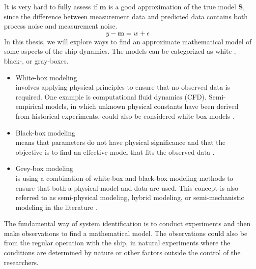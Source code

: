 It is very hard to fully assess if $\mathbf{m}$ is a good approximation of the true model $\mathbf{S}$, since the difference between measurement data and predicted data contains both process noise and measurement noise.
$$
y - \mathbf{m} = w + \epsilon
$$
In this thesis, we will explore ways to find an approximate mathematical model of some aspects of the ship dynamics. The models can be categorized as white-, black-, or gray-boxes. 
\vspace{5pt}
\begin{itemize}
    \setlength\itemsep{5pt}
    \item White-box modeling \\
    involves applying physical principles to ensure that no observed data is required. One example is computational fluid dynamics (CFD). Semi-empirical models, in which unknown physical constants have been derived from historical experiments, could also be considered white-box models \cite{leifsson_grey-box_2008}.  

    \item Black-box modeling \\
    means that parameters do not have physical significance and that the objective is to find an effective model that fits the observed data \cite{lindskog_tools_1995}.
    
    \item Grey-box modeling \\
    is using a combination of white-box and black-box modeling methods to ensure that both a physical model and data are used. This concept is also referred to as semi-physical modeling, hybrid modeling, or semi-mechanistic modeling in the literature \cite{leifsson_grey-box_2008}. 
\end{itemize}
\vspace{5pt}
The fundamental way of system identification is to conduct experiments and then make observations to find a mathematical model. 
The observations could also be from the regular operation with the ship, in natural experiments where the conditions are determined by nature or other factors outside the control of the researchers.

